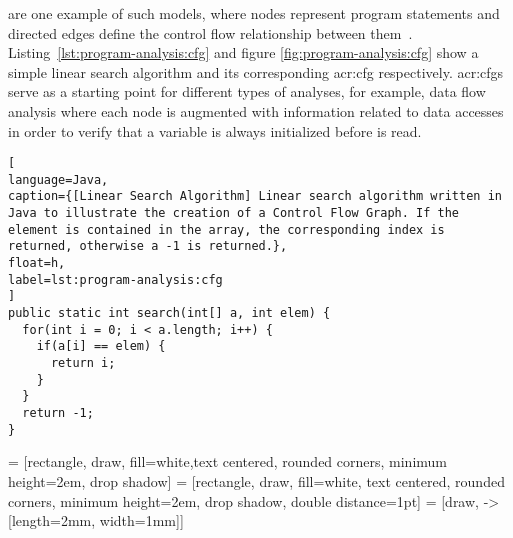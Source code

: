\textit{} are one example of such models, where nodes represent program statements and directed edges define the control flow relationship between them~\cite{Allen1970}. Listing~\ref{lst:program-analysis:cfg} and figure \ref{fig:program-analysis:cfg} show a simple linear search algorithm and its corresponding \acrlong{acr:cfg} respectively. \acrshort{acr:cfg}s serve as a starting point for different types of analyses, for example, data flow analysis where each node is augmented with information related to data accesses in order to verify that a variable is always initialized before is read. 

\begin{lstlisting}[
language=Java,
caption={[Linear Search Algorithm] Linear search algorithm written in Java to illustrate the creation of a Control Flow Graph. If the element is contained in the array, the corresponding index is returned, otherwise a -1 is returned.},
float=h,
label=lst:program-analysis:cfg
]
public static int search(int[] a, int elem) {
  for(int i = 0; i < a.length; i++) {
    if(a[i] == elem) {
      return i;
    }
  }
  return -1;
}
\end{lstlisting}

 = [rectangle, draw, fill=white,text centered, rounded corners, minimum height=2em, drop shadow]
 = [rectangle, draw, fill=white, text centered, rounded corners, minimum height=2em, drop shadow, double distance=1pt]
 = [draw, -{>[length=2mm, width=1mm]}]

